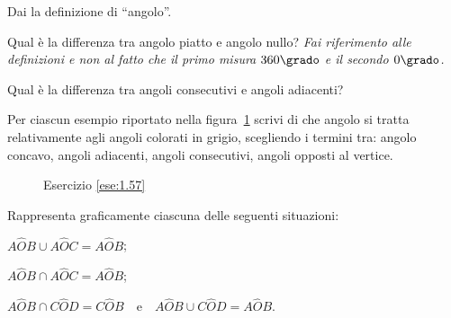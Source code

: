 \begin{esercizio}
\label{ese:1.54}
Dai la definizione di ``angolo''.
\end{esercizio}

\begin{esercizio}
\label{ese:1.55}
Qual è la differenza tra angolo piatto e angolo nullo? \emph{Fai 
riferimento alle definizioni e non al fatto che il primo misura 
$360\grado$ e il secondo $0\grado$.}
\end{esercizio}

\begin{esercizio}
\label{ese:1.56}
Qual è la differenza tra angoli consecutivi e angoli adiacenti?
\end{esercizio}

\begin{esercizio}
\label{ese:1.57}
Per ciascun esempio riportato nella figura~\ref{fig:ese1.57} scrivi 
di che angolo si tratta relativamente agli angoli colorati in grigio, 
scegliendo i termini tra: angolo concavo, angoli adiacenti, angoli 
consecutivi, angoli opposti al vertice.
\end{esercizio}


\begin{inaccessibleblock}
 \begin{figure}[htb]
 \centering
 \caption{Esercizio \ref{ese:1.57}}\label{fig:ese1.57}
\end{figure}
\end{inaccessibleblock}

\begin{esercizio}
\label{ese:1.58}
Rappresenta graficamente ciascuna delle seguenti situazioni:
\begin{enumeratea}
\item $A\widehat{O}B\cup A\widehat{O}C=A\widehat{O}B$;
\item $A\widehat{O}B\cap A\widehat{O}C=A\widehat{O}B$;
\item $A\widehat{O}B\cap 
C\widehat{O}D=C\widehat{O}B$~~e~~$A\widehat{O}B\cup 
C\widehat{O}D=A\widehat{O}B$.
\end{enumeratea}
\end{esercizio}

